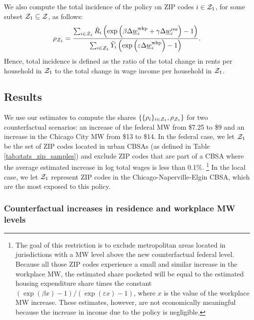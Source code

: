 We also compute the total incidence of the policy on ZIP codes $i\in\mathcal{Z}_1$,
for some subset $\mathcal{Z}_1\subseteq\mathcal{Z}$, as follows:
\begin{equation*}\label{eq:tot_incidence}
    \rho_{\mathcal{Z}_1} = 
        \frac{\sum_{i\in\mathcal{Z}_1} \tilde R_i \left(\exp \left( \beta \Delta \underline{w}_i^{\text{wkp}} 
                                    + \gamma \Delta \underline{w}_i^{\text{res}} \right) - 1\right) }
            {\sum_{i\in\mathcal{Z}_1} \tilde Y_i \left( \exp \left( \varepsilon \Delta \underline{w}_i^{\text{wkp}} \right) 
                                    - 1\right) } .
\end{equation*}
Hence, total incidence is defined as the ratio of the total change in rents
per household in $\mathcal{Z}_1$ to the total change in wage income per household 
in $\mathcal{Z}_1$.

\subsection{Results}\label{sec:results_cf}

We use our estimates to compute the shares 
$\{\{\rho_i\}_{i\in\mathcal{Z}_1},\rho_{\mathcal{Z}_1}\}$ for two counterfactual scenarios:
an increase of the federal MW from \$7.25 to \$9 and 
an increase in the Chicago City MW from \$13 to \$14.
In the federal case, we let $\mathcal{Z}_1$ be the set of ZIP codes located in urban 
CBSAs (as defined in Table \ref{tab:stats_zip_samples}) and exclude ZIP codes 
that are part of a CBSA where the average estimated increase in log total wages 
is less than 0.1\%.%
\footnote{\label{foot:restriction_on_zipcodes}
The goal of this restriction is to exclude metropolitan areas located 
in jurisdictions with a MW level above the new counterfactual federal level.
Because all those ZIP codes experience a small and similar increase in the 
workplace MW, the estimated share pocketed will be equal to the estimated
housing expenditure share times the constant 
$\left(\exp(\beta x)-1\right)/\left(\exp(\varepsilon x)-1\right)$,
where $x$ is the value of the workplace MW increase.
These estimates, however, are not economically meaningful because the increase
in income due to the policy is negligible.}
In the local case, we let $\mathcal{Z}_1$ represent ZIP codes in the 
Chicago-Naperville-Elgin CBSA, which are the most exposed to this policy.

\subsubsection{Counterfactual increases in residence and workplace MW levels}
\label{sec:cf_res_and_wkp_changes}

